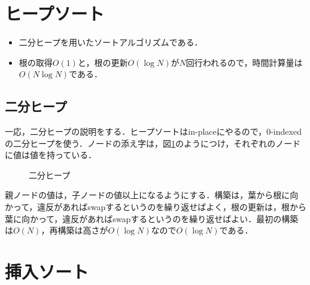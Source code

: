 \documentclass[slide,20pt]{ltjsarticle}
\begin{document}
\section{ヒープソート}

\begin{itemize}
  \item 二分ヒープを用いたソートアルゴリズムである．
  \item 根の取得$O(1)$と，根の更新$O(\log N)$が$N$回行われるので，時間計算量は$O(N \log N)$である．
\end{itemize}

\subsection{二分ヒープ}

一応，二分ヒープの説明をする．ヒープソートはin-placeにやるので，0-indexedの二分ヒープを使う．ノードの添え字は，図\ref{fig:heap}のようにつけ，それぞれのノードに値は値を持っている．

\begin{figure}[h]
  \centering
  \caption{二分ヒープ}
  \label{fig:heap}
\end{figure}

親ノードの値は，子ノードの値以上になるようにする．構築は，葉から根に向かって，違反があればswapするというのを繰り返せばよく，根の更新は，根から葉に向かって，違反があればswapするというのを繰り返せばよい．最初の構築は$O(N)$，再構築は高さが$O(\log N)$なので$O(\log N)$である．

\section{挿入ソート}
\end{document}
